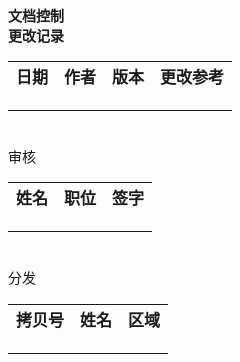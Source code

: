 \documentclass[zihao=-4]{ctexart}
\begin{document}
%		
	
	\newpage
	\pagestyle{fancy}%
	{\noindent {}\bf 文档控制\\
	 更改记录
	\setlength\doublerulesep{2pt}
	
	\begin{tabular}{|p{2cm}|p{3cm}|p{2cm}|p{8cm}|}
		\hline
		\rowcolor[rgb]{0.898,0.898,0.898} \textbf{日期} & \textbf{作者} & \textbf{版本} & \textbf{更改参考}\\\hhline{|=|=|=|=|}
		& & & \\\hline
		& & & \\\hline
		& & & \\\hline
	\end{tabular}\\
	 审核
	
	\begin{tabular}{|p{2cm}|p{3cm}|p{10.5cm}|}
		\hline
		\rowcolor[rgb]{0.898,0.898,0.898} \textbf{姓名} & \textbf{职位} & \textbf{签字} \\\hhline{|=|=|=|}
		& & \\\hline
		& & \\\hline
		& & \\\hline
	\end{tabular}\\	
	 分发
	
	\begin{tabular}{|p{2cm}|p{3cm}|p{10.5cm}|}
		\hline
		\rowcolor[rgb]{0.898,0.898,0.898} \textbf{拷贝号} & \textbf{姓名} & \textbf{区域} \\\hhline{|=|=|=|}
		& & \\\hline
		& & \\\hline
		& & \\\hline
	\end{tabular}
}
	\newpage
	\rhead{\leftmark}
	\tableofcontents
	\newpage
	
\end{document}
